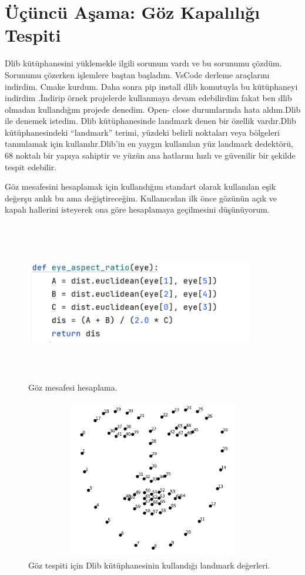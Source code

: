 \documentclass[12pt, a4paper]{article}
\begin{document}
 \section{ Üçüncü Aşama: Göz Kapalılığı Tespiti} 
 Dlib kütüphanesini yüklemekle ilgili sorunum vardı ve bu sorunumu çözdüm. Sorunumu çözerken işlemlere baştan başladım. VsCode derleme araçlarını indirdim. Cmake kurdum. Daha sonra pip install dlib komutuyla bu kütüphaneyi indirdim \cite{onursahin}.İndirip örnek projelerde kullanmaya devam edebilirdim fakat ben dlib olmadan kullandığım projede denedim. Open- close durumlarında hata aldım.Dlib ile denemek istedim. Dlib kütüphanesinde landmark denen bir özellik vardır.Dlib kütüphanesindeki “landmark” terimi, yüzdeki belirli noktaları veya bölgeleri tanımlamak için kullanılır.Dlib’in en yaygın kullanılan yüz landmark dedektörü, 68 noktalı bir yapıya sahiptir ve yüzün ana hatlarını hızlı ve güvenilir bir şekilde tespit edebilir. \par Göz mesafesini hesaplamak için kullandığım standart olarak kullanılan eşik değerşu anlık bu ama değiştireceğim. Kullanıcıdan ilk önce gözünün açık ve kapalı hallerini isteyerek ona göre hesaplamaya geçilmesini düşünüyorum. \newpage
 \begin{figure}
 	\centering
 	\includegraphics[width=10cm, height=7cm, keepaspectratio]{kod.jpg}
 	\caption{Göz mesafesi hesaplama.} 
 \end{figure} \par \begin{figure}[!h]
 	\centering
 	\includegraphics[width=17cm, height=7cm, keepaspectratio]{landmarks.jpg}
 	\caption{Göz tespiti için Dlib kütüphanesinin kullandığı landmark değerleri\cite{amos2018}.} 
 	\par
 \end{figure} 
\end{document}
